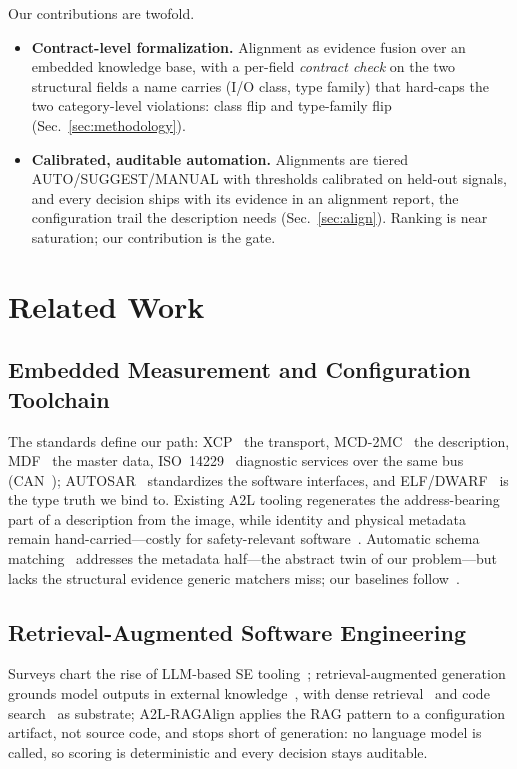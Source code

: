 \documentclass[conference]{IEEEtran}
\newcommand{\toolname}{A2L-RAGAlign}
\begin{document}
Our contributions are twofold.
\begin{itemize}
    \item \textbf{Contract-level formalization.} Alignment as evidence
  fusion over an embedded knowledge base, with a per-field \emph{contract
  check} on the two structural fields a name carries (I/O class, type
  family) that hard-caps the two category-level violations: class flip and
  type-family flip (Sec.~\ref{sec:methodology}).
  \item \textbf{Calibrated, auditable automation.} Alignments are tiered
  AUTO/SUGGEST/MANUAL with thresholds calibrated on held-out signals, and
  every decision ships with its evidence in an alignment report, the
  configuration trail the description needs (Sec.~\ref{sec:align}). Ranking
  is near saturation; our contribution is the gate.
\end{itemize}

\section{Related Work}
\label{sec:related}

\subsection{Embedded Measurement and Configuration Toolchain}
\label{sec:rw-infra}
The standards define our path: XCP~\cite{asam2017xcp} the transport,
MCD-2MC~\cite{asam2018mcd2mc} the description, MDF~\cite{asam2025mdf} the master
data, ISO~14229~\cite{iso14229} diagnostic services over the same bus
(CAN~\cite{iso11898}); AUTOSAR~\cite{autosar2018overview} standardizes the
software interfaces, and ELF/DWARF~\cite{dwarf2017dwarf5} is the type truth we
bind to. Existing A2L tooling regenerates the address-bearing part of a
description from the image, while identity and physical metadata remain
hand-carried---costly for safety-relevant software~\cite{iso26262}. Automatic
schema matching~\cite{rahm2001schema} addresses the metadata half---the
abstract twin of our problem---but lacks the structural evidence generic
matchers miss; our baselines follow~\cite{bilenko2003adaptive}.

\subsection{Retrieval-Augmented Software Engineering}
\label{sec:rw-rag}
Surveys chart the rise of LLM-based SE tooling~\cite{fan2023llm4se,hou2024llm4se};
retrieval-augmented generation grounds model outputs in external
knowledge~\cite{lewis2020rag,gao2023ragsurvey}, with dense
retrieval~\cite{karpukhin2020} and code search~\cite{gu2018codesearch} as
substrate; \toolname{} applies the RAG pattern to a configuration artifact,
not source code, and stops short of generation: no language model is called,
so scoring is deterministic and every decision stays auditable.
\end{document}
